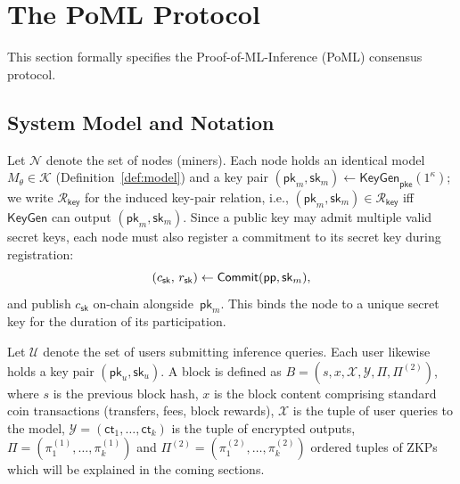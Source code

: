 \section{The PoML Protocol}
\label{sec:protocol}

This section formally specifies the Proof-of-ML-Inference (PoML) consensus protocol. 

\subsection{System Model and Notation}
\label{sec:poml-system-def}

Let $\mathcal{N}$ denote the set of nodes (miners). Each node holds an identical model $M_\theta \in \mathcal{K}$ (Definition~\ref{def:model}) and a key pair $(\mathsf{pk}_m, \mathsf{sk}_m) \leftarrow \mathsf{KeyGen}_{\mathsf{pke}}(1^\kappa)$; we write $\mathcal{R}_{\mathsf{key}}$ for the induced key-pair relation, i.e., $(\mathsf{pk}_m, \mathsf{sk}_m) \in \mathcal{R}_{\mathsf{key}}$ iff $\mathsf{KeyGen}$ can output $(\mathsf{pk}_m, \mathsf{sk}_m)$. Since a public key may admit multiple valid secret keys, each node must also register a commitment to its secret key during registration:
\[
(c_{\mathsf{sk}},\, r_{\mathsf{sk}}) \leftarrow \mathsf{Commit}(\mathsf{pp},\mathsf{sk}_m),
\]
and publish $c_{\mathsf{sk}}$ on-chain alongside~$\mathsf{pk}_m$. This binds the node to a unique secret key for the duration of its participation.

Let $\mathcal{U}$ denote the set of users submitting inference queries. Each user likewise holds a key pair $(\mathsf{pk}_u, \mathsf{sk}_u)$. A block is defined as $B = (s, x, \mathcal{X}, \mathcal{Y}, \Pi, \Pi^{(2)})$, where $s$ is the previous block hash, $x$ is the block content comprising standard coin transactions (transfers, fees, block rewards), $\mathcal{X}$ is the tuple of user queries to the model, $\mathcal{Y} = (\mathsf{ct}_1, \ldots, \mathsf{ct}_k)$ is the tuple of encrypted outputs, $\Pi = (\pi_1^{(1)}, \ldots, \pi_k^{(1)})$ and $\Pi^{(2)} = (\pi_1^{(2)}, \ldots, \pi_k^{(2)})$ ordered tuples of ZKPs which will be explained in the coming sections. 

